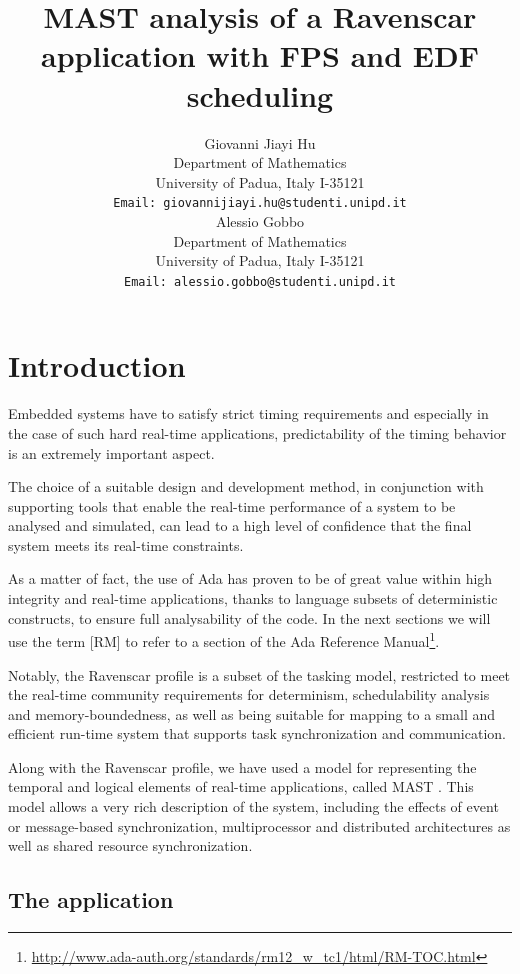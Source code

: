 \documentclass{article}
\title{MAST analysis of a Ravenscar application with FPS and EDF scheduling}
\author{
  Giovanni Jiayi Hu\\
  Department of Mathematics\\
  University of Padua, Italy I-35121\\
  \texttt{Email: giovannijiayi.hu@studenti.unipd.it} \\
   \And
   Alessio Gobbo \\
   Department of Mathematics\\
   University of Padua, Italy I-35121\\
   \texttt{Email: alessio.gobbo@studenti.unipd.it} \\
}
\begin{document}
\maketitle

\begin{abstract}
\lipsum[1]
\end{abstract}



\section{Introduction}

Embedded systems have to satisfy strict timing requirements and especially in the case of such hard real-time applications, predictability of the timing behavior is an extremely important aspect.

The choice of a suitable design and development method, in conjunction with supporting tools that enable the real-time performance of a system to be analysed and simulated, can lead to a high level of confidence that the final system meets its real-time constraints.

As a matter of fact, the use of Ada has proven to be of great value within high integrity and real-time applications, thanks to language subsets of deterministic constructs, to ensure full analysability of the code. In the next sections we will use the term [RM] to refer to a section of the Ada Reference Manual\footnote{\url{http://www.ada-auth.org/standards/rm12_w_tc1/html/RM-TOC.html}}.

Notably, the Ravenscar profile \cite{ycs} is a subset of the tasking model, restricted to meet the real-time community requirements for determinism, schedulability analysis and memory-boundedness, as well as being suitable for mapping to a small and efficient run-time system that supports task synchronization and communication.

Along with the Ravenscar profile, we have used a model for representing the temporal and logical elements of real-time applications, called MAST \cite{mast}. This model allows a very rich description of the system, including the effects of event or message-based synchronization, multiprocessor and distributed architectures as well as shared resource synchronization.

\subsection{The application}
\end{document}
